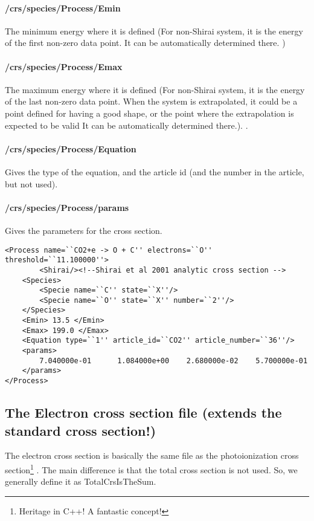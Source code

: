 \paragraph{/crs/species/Process/Emin} The minimum energy where it is defined (For non-Shirai system, it is the energy of the first non-zero data point. It can be automatically determined there. )
\paragraph{/crs/species/Process/Emax} The maximum energy where it is defined (For non-Shirai system, it is the energy of the last non-zero data point. When the system is extrapolated, it could be a point defined for having a good shape, or the point where the extrapolation is expected to be valid It can be automatically determined there.).
.
\paragraph{/crs/species/Process/Equation} Gives the type of the equation, and the article id (and the number in the article, but not used).

\paragraph{/crs/species/Process/params} Gives the parameters for the cross section.


\begin{verbatim}
<Process name=``CO2+e -> O + C'' electrons=``O'' threshold=``11.100000''>
		<Shirai/><!--Shirai et al 2001 analytic cross section -->
	<Species>
		<Specie name=``C'' state=``X''/>
		<Specie name=``O'' state=``X'' number=``2''/>
	</Species>
	<Emin> 13.5 </Emin>
	<Emax> 199.0 </Emax>
	<Equation type=``1'' article_id=``CO2'' article_number=``36''/>
	<params>
		7.040000e-01	  1.084000e+00	  2.680000e-02	  5.700000e-01
	</params>
</Process>
\end{verbatim}
\subsection{The Electron cross section file (extends the standard cross section!)}

The electron cross section is basically the same file as the photoionization cross section\footnote{Heritage in C++! A fantastic concept!} .
The main difference is that the total cross section is not used. So, we generally define it as TotalCrsIsTheSum.


